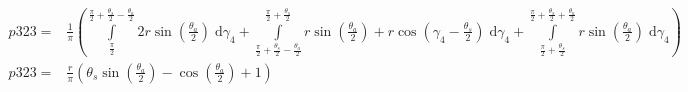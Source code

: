 \begin{align}
    p323 =&\frac{1}{\pi} \left(\int\limits_{\frac{\pi}{2}}^{\frac{\pi}{2} + \frac{\theta_{s}}{2} - \frac{\theta_{a}}{2}}2 r \sin{\left (\frac{\theta_{a}}{2} \right )}\;\mathrm{d}\gamma_{4}+\int\limits_{\frac{\pi}{2} + \frac{\theta_{s}}{2} - \frac{\theta_{a}}{2}}^{\frac{\pi}{2} + \frac{\theta_{s}}{2}}r \sin{\left (\frac{\theta_{a}}{2} \right )} + r \cos{\left (\gamma_{4} - \frac{\theta_{s}}{2} \right )}\;\mathrm{d}\gamma_{4}+\int\limits_{\frac{\pi}{2} + \frac{\theta_{s}}{2}}^{\frac{\pi}{2} + \frac{\theta_{s}}{2} + \frac{\theta_{a}}{2}}r \sin{\left (\frac{\theta_{a}}{2} \right )}\;\mathrm{d}\gamma_{4}\right)\\
    p323 =& \frac{r}{\pi} \left(\theta_{s} \sin{\left (\frac{\theta_{a}}{2} \right )} - \cos{\left (\frac{\theta_{a}}{2} \right )} + 1\right)
\end{align}